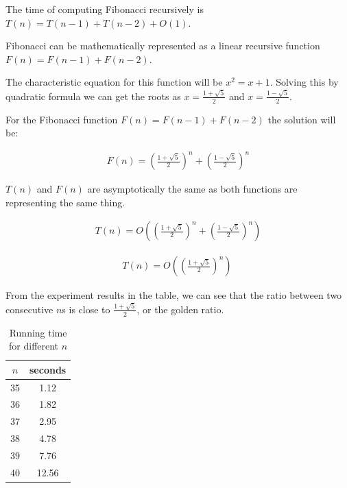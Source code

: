 \documentclass[10pt]{article}
\begin{document}
\begin{enumerate}
{        The time of computing Fibonacci recursively is $T(n) = T(n-1) + T(n-2) + O(1)$.

        Fibonacci can be mathematically represented as a linear recursive function $F(n) = F(n-1) + F(n-2)$.

        The characteristic equation for this function will be $x^2 = x + 1$.
        Solving this by quadratic formula we can get the roots as $x = \frac{1+\sqrt{5}}{2}$ and $x = \frac{1-\sqrt{5}}{2}$.

        For the Fibonacci function $F(n) = F(n-1) + F(n-2)$ the solution will be:

        \begin{align*}
          F(n) = \left( \frac{1+\sqrt{5}}{2} \right)^n + \left( \frac{1-\sqrt{5}}{2} \right)^n
        \end{align*}

        $T(n)$ and $F(n)$ are asymptotically the same as both functions are representing the same thing.

        \begin{align*}
          T(n) = O \left( \left( \frac{1+\sqrt{5}}{2} \right)^n + \left( \frac{1-\sqrt{5}}{2} \right)^n \right)
        \end{align*}

        \begin{align*}
          T(n) = O \left( \left( \frac{1+\sqrt{5}}{2} \right)^n \right) \
        \end{align*}

        From the experiment results in the table, we can see that the ratio between two consecutive $n$s is close to $\frac{1+\sqrt{5}}{2}$, or the golden ratio.

        \begin{table}[H]
          \centering
          \caption{Running time for different $n$}
          \label{tab:csv_data}
          \begin{tabular}{cc}
            \hline
            \textbf{$n$} & \textbf{seconds} \\
            \hline
            35           & 1.12             \\
            36           & 1.82             \\
            37           & 2.95             \\
            38           & 4.78             \\
            39           & 7.76             \\
            40           & 12.56            \\
            \hline
          \end{tabular}
        \end{table}

}
\end{enumerate}
\end{document}
